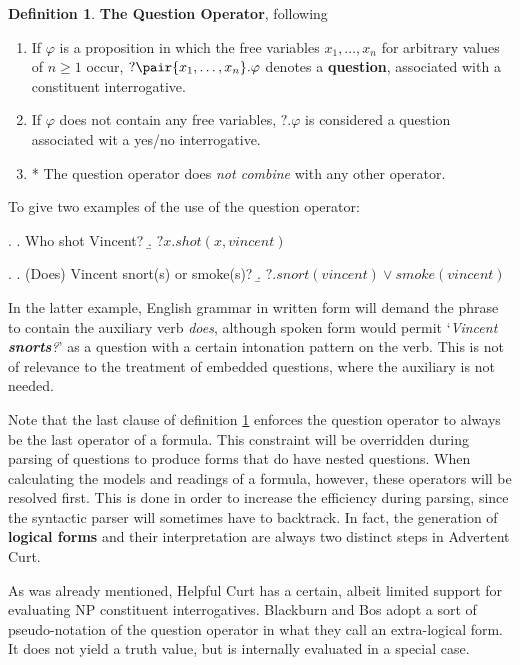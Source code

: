 \documentclass[notitlepage,twoside,a4paper]{scrreprt}
\newcommand{\stress}{\textbf} %
\newcommand{\term}[1]{\textsf{\textbf{#1}}} %
\newcommand{\pn}{\textsf} %
\newcommand{\example}[1]{`\textit{#1}'} %
\newcommand{\acurt}{\pn{Advertent Curt}}
\theoremstyle{remark}
\theoremstyle{remark}
\theoremstyle{definition}
\newtheorem{definition}[thm]{Definition}
\theoremstyle{definition}
\begin{document}
\begin{definition}\label{def:qop}
  \stress{The Question Operator}, following \cite{gs:q}
  \begin{enumerate}
    \item If $\varphi$ is a proposition in which the free variables
    $x_1,\ldots,x_n$ for arbitrary values of $n \geq 1$ occur,
    $?\pair{x_1,\ldots,x_n}.\varphi$ denotes a \term{question}, associated with
    a constituent interrogative.
    \item If $\varphi$ does not contain any free variables, $?.\varphi$ is
    considered a question associated wit a yes/no interrogative.
    \item * \label{def:outermost}The question operator does \emph{not combine} with any other operator.
  \end{enumerate}
\end{definition}

To give two examples of the use of the question operator:

\ex. \a. Who shot Vincent?
\b. $?x.shot(x,vincent)$

\ex. \a. (Does) Vincent snort(s) or smoke(s)?
\b. $?.snort(vincent) \vee smoke(vincent)$

In the latter example, English grammar in written form will demand the phrase to
contain the auxiliary verb \emph{does}, although spoken form would permit
\example{Vincent \stress{snorts}?} as a question with a certain intonation
pattern on the verb. This is not of relevance to the treatment of embedded
questions, where the auxiliary is not needed.

Note that the last clause of definition \ref{def:qop} enforces the question
operator to always be the last operator of a formula. This constraint will be
overridden during parsing of questions to produce forms that do have nested
questions.  When calculating the models and readings of a formula, however,
these operators will be resolved first. This is done in order to increase the
efficiency during parsing, since the syntactic parser will sometimes have to
backtrack. In fact, the generation of \term{logical forms} and their
interpretation are always two distinct steps in \acurt.

As was already mentioned, \pn{Helpful Curt} has a certain, albeit limited
support for evaluating NP constituent interrogatives. Blackburn and Bos adopt a
sort of pseudo-notation of the question operator in what they call an
extra-logical form. It does not yield a truth value, but is internally evaluated
in a special case.
\end{document}
